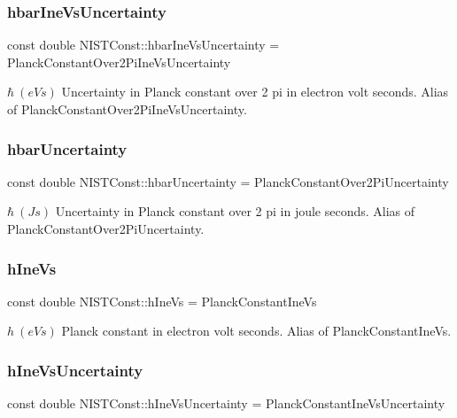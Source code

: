 \subsubsection{\texorpdfstring{hbar\+Ine\+Vs\+Uncertainty}{hbarIneVsUncertainty}}
{\footnotesize\ttfamily const double N\+I\+S\+T\+Const\+::hbar\+Ine\+Vs\+Uncertainty = Planck\+Constant\+Over2\+Pi\+Ine\+Vs\+Uncertainty}

$\hbar \ (eV s)$ Uncertainty in Planck constant over 2 pi in electron volt seconds. Alias of Planck\+Constant\+Over2\+Pi\+Ine\+Vs\+Uncertainty. \mbox{\label{group___planck_constant_ga2f2785d3e09a94615ed207e936f73f74}} 
\subsubsection{\texorpdfstring{hbar\+Uncertainty}{hbarUncertainty}}
{\footnotesize\ttfamily const double N\+I\+S\+T\+Const\+::hbar\+Uncertainty = Planck\+Constant\+Over2\+Pi\+Uncertainty}

$\hbar \ (J s)$ Uncertainty in Planck constant over 2 pi in joule seconds. Alias of Planck\+Constant\+Over2\+Pi\+Uncertainty. \mbox{\label{group___planck_constant_gabdd6f21b3e5325e4df4a021ee6b6a506}} 
\subsubsection{\texorpdfstring{h\+Ine\+Vs}{hIneVs}}
{\footnotesize\ttfamily const double N\+I\+S\+T\+Const\+::h\+Ine\+Vs = Planck\+Constant\+Ine\+Vs}

$h \ (eV s)$ Planck constant in electron volt seconds. Alias of Planck\+Constant\+Ine\+Vs. \mbox{\label{group___planck_constant_gadbf2b61fe6b0389e003a788047ad0c43}} 
\subsubsection{\texorpdfstring{h\+Ine\+Vs\+Uncertainty}{hIneVsUncertainty}}
{\footnotesize\ttfamily const double N\+I\+S\+T\+Const\+::h\+Ine\+Vs\+Uncertainty = Planck\+Constant\+Ine\+Vs\+Uncertainty}

